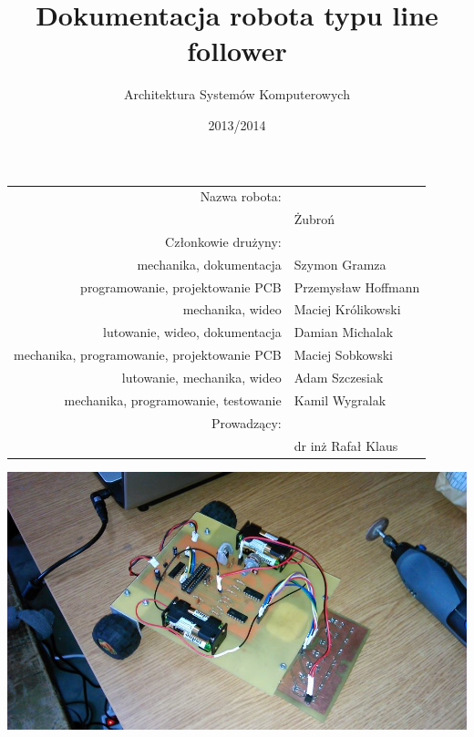 \documentclass[11pt,a4paper]{article}
\author{Architektura Systemów Komputerowych}
\title{Dokumentacja robota typu line follower}
\date{2013/2014}
\begin{document}
\maketitle

\begin{center}
\begin{tabularx}{\linewidth}{rl}
  \hline
  Nazwa robota: & \\
  & Żubroń \\
  \hline 
  Członkowie drużyny: & \\
  mechanika, dokumentacja & Szymon Gramza \\
  programowanie, projektowanie PCB & Przemysław Hoffmann \\
  mechanika, wideo & Maciej Królikowski \\
  lutowanie, wideo, dokumentacja & Damian Michalak \\
  mechanika, programowanie, projektowanie PCB & Maciej Sobkowski \\
  lutowanie, mechanika, wideo & Adam Szczesiak \\
  mechanika, programowanie, testowanie & Kamil Wygralak \\
  \hline
  Prowadzący: & \\
  & dr inż Rafał Klaus \\
  \hline
\end{tabularx} 
\end{center} %
\vspace{1.5cm}
\includegraphics[scale=0.48]{zubron_main}

\newpage
\tableofcontents
\newpage
\end{document}
